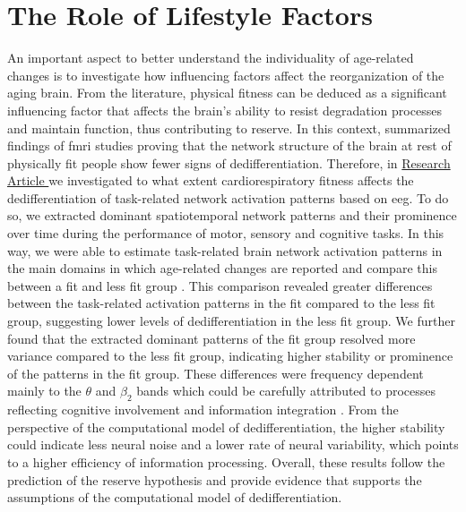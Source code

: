 \section{The Role of Lifestyle Factors}
An important aspect to better understand the individuality of age-related changes is to investigate how influencing factors affect the reorganization of the aging brain. From the literature, physical fitness can be deduced as a significant influencing factor that affects the brain's ability to resist degradation processes and maintain function, thus contributing to reserve. In this context, \citeauthor{Stillman2019} \cite{Stillman2019} summarized findings of \gls{fmri} studies proving that the network structure of the brain at rest of physically fit people show fewer signs of dedifferentiation. Therefore, in \hyperref[results:paperIII]{Research Article } we investigated to what extent cardiorespiratory fitness affects the dedifferentiation of task-related network activation patterns based on \gls{eeg}. To do so, we extracted dominant spatiotemporal network patterns and their prominence over time during the performance of motor, sensory and cognitive tasks. In this way, we were able to estimate task-related brain network activation patterns in the main domains in which age-related changes are reported and compare this between a fit and less fit group \cite{Baltes1997, Sala-Llonch2015, Park2009}. This comparison revealed greater differences between the task-related activation patterns in the fit compared to the less fit group, suggesting lower levels of dedifferentiation in the less fit group. We further found that the extracted dominant patterns of the fit group resolved more variance compared to the less fit group, indicating higher stability or prominence of the patterns in the fit group. These differences were frequency dependent mainly to the $\theta$ and $\beta_2$ bands which could be carefully attributed to processes reflecting cognitive involvement and information integration \cite{Siegel2012}. From the perspective of the computational model of dedifferentiation, the higher stability could indicate less neural noise and a lower rate of neural variability, which points to a higher efficiency of information processing. Overall, these results follow the prediction of the reserve hypothesis and provide evidence that supports the assumptions of the computational model of dedifferentiation.\\
